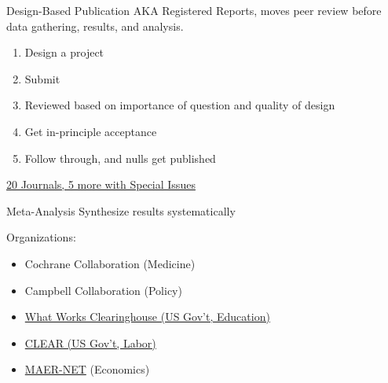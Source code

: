 \documentclass{beamer}
\begin{document}
 { %
    \begin{frame}[plain, label=AEAreg]
     \end{frame}
}

\begin{frame}{Design-Based Publication}
AKA Registered Reports, moves peer review before data gathering, results, and analysis.

\begin{enumerate}[<.->]
\item Design a project
\item Submit
\item Reviewed based on importance of question and quality of design
\item Get in-principle acceptance
\item Follow through, and nulls get published
\end{enumerate}
\href{https://osf.io/8mpji/wiki/home/}{20 Journals, 5 more with Special Issues }
\end{frame}

{ %
    \begin{frame}[plain, label=AEAreg]
     \end{frame}
}

\begin{frame}{Meta-Analysis}
Synthesize results systematically

\vspace{.2in}
Organizations:
\begin{itemize}[<.->]
\item Cochrane Collaboration (Medicine)
\item Campbell Collaboration (Policy)
\item \href{http://ies.ed.gov/ncee/wwc/}{What Works Clearinghouse (US Gov't, Education)}
\item \href{http://clear.dol.gov/}{CLEAR (US Gov't, Labor)}
\item \href{https://www.hendrix.edu/maer-network/}{MAER-NET} (Economics)
\end{itemize}
\end{frame}
\end{document}
